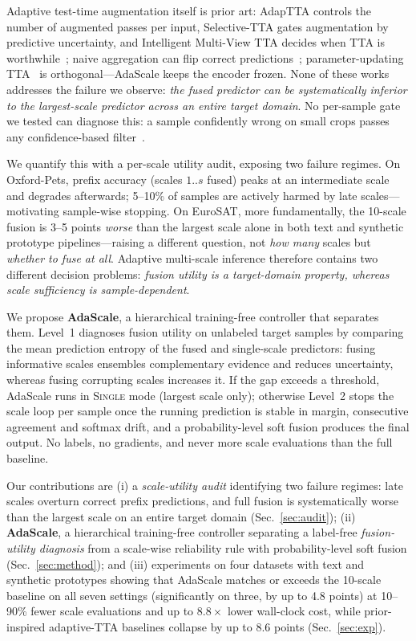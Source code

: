 \documentclass{article}
\begin{document}
Adaptive test-time augmentation itself is prior art: AdapTTA controls the
number of augmented passes per input, Selective-TTA gates augmentation
by predictive uncertainty, and Intelligent Multi-View TTA decides when
TTA is worthwhile~\cite{mocerino2021adaptta,son2023selective,ozturk2024intelligent};
naive aggregation can flip correct
predictions~\cite{shanmugam2021better}; parameter-updating
TTA~\cite{wang2021tent,sun2020ttt} is orthogonal---AdaScale keeps
the encoder frozen. None of these works addresses the
failure we observe: \emph{the fused predictor can be systematically
inferior to the largest-scale predictor across an entire target domain}.
No per-sample gate we tested can diagnose this: a sample confidently
wrong on small crops passes any confidence-based filter~\cite{guo2017calibration}.

We quantify this with a per-scale utility audit, exposing two failure
regimes. On Oxford-Pets, prefix accuracy (scales $1..s$ fused) peaks at an
intermediate scale and degrades afterwards; 5--10\% of samples are
actively harmed by late scales---motivating sample-wise stopping. On
EuroSAT, more fundamentally, the 10-scale fusion is 3--5 points
\emph{worse} than the largest scale alone in both text and synthetic
prototype pipelines---raising a different question, not \emph{how many}
scales but \emph{whether to fuse at all}. Adaptive multi-scale
inference therefore contains two different decision problems:
\emph{fusion utility is a target-domain property, whereas scale
sufficiency is sample-dependent}.

We propose \textbf{AdaScale}, a hierarchical training-free controller
that separates them. Level~1 diagnoses fusion utility on unlabeled
target samples by comparing the mean prediction entropy of the fused
and single-scale predictors: fusing informative scales ensembles
complementary evidence and reduces uncertainty, whereas fusing
corrupting scales increases it. If the gap exceeds a threshold,
AdaScale runs in \textsc{Single} mode (largest scale only); otherwise
Level~2 stops the scale loop per sample once the running prediction
is stable in margin, consecutive agreement and softmax drift, and a
probability-level soft fusion produces the final output. No labels, no
gradients, and never more scale evaluations than the full baseline.

Our contributions are (i) a \emph{scale-utility audit} identifying two
failure regimes: late scales overturn correct prefix predictions, and
full fusion is systematically worse than the largest scale on an entire
target domain (Sec.~\ref{sec:audit}); (ii) \textbf{AdaScale}, a
hierarchical training-free controller separating a label-free
\emph{fusion-utility diagnosis} from a scale-wise reliability rule with
probability-level soft fusion
(Sec.~\ref{sec:method}); and (iii) experiments on four datasets with
text and synthetic prototypes showing that AdaScale matches or exceeds
the 10-scale baseline on all seven settings (significantly on three, by up
to 4.8 points) at 10--90\% fewer scale evaluations and up to
$8.8\times$ lower wall-clock cost, while prior-inspired adaptive-TTA
baselines collapse by up to 8.6 points (Sec.~\ref{sec:exp}).
\end{document}

